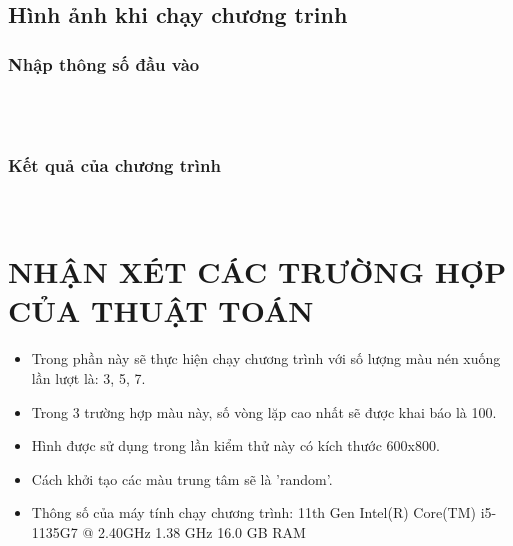 \documentclass{report}
\begin{document}
\subsection{Hình ảnh khi chạy chương trinh}
\subsubsection{Nhập thông số đầu vào}
\begin{figure}[ht!]
     \begin{center}
%
        \\ %
        \\%
        
%
    \end{center}
\end{figure}
\subsubsection{Kết quả của chương trình}
\begin{figure}[ht!]
     \begin{center}
%
        \\ %
    \end{center}
\end{figure}
\section{NHẬN XÉT CÁC TRƯỜNG HỢP CỦA THUẬT TOÁN}
\begin{itemize}
    \item Trong phần này sẽ thực hiện chạy chương trình với số lượng màu nén xuống lần lượt là: 3, 5, 7.
    \item Trong 3 trường hợp màu này, số vòng lặp cao nhất sẽ được khai báo là 100.
    \item Hình được sử dụng trong lần kiểm thử này có kích thước 600x800.
    \item Cách khởi tạo các màu trung tâm sẽ là 'random'.
    \item Thông số của máy tính chạy chương trình: 11th Gen Intel(R) Core(TM) i5-1135G7 @ 2.40GHz   1.38 GHz 16.0 GB RAM
\end{itemize}
\end{document}

